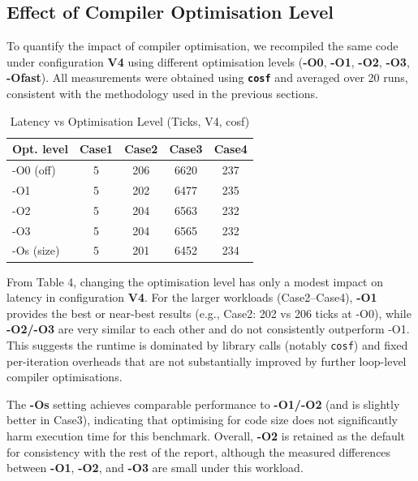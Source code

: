 \subsection{Effect of Compiler Optimisation Level}

To quantify the impact of compiler optimisation, we recompiled the same code under configuration \textbf{V4} using different optimisation levels (\textbf{-O0}, \textbf{-O1}, \textbf{-O2}, \textbf{-O3}, \textbf{-Ofast}). 
All measurements were obtained using \textbf{\texttt{cosf}} and averaged over 20 runs, consistent with the methodology used in the previous sections.

\begin{table}[H]
\centering
\caption{Latency vs Optimisation Level (Ticks, V4, cosf)}
\begin{tabular}{lcccc}
\toprule
Opt. level & Case1 & Case2 & Case3 & Case4 \\
\midrule
-O0 (off) & 5 & 206 & 6620 & 237 \\
-O1       & 5 & 202 & 6477 & 235 \\
-O2       & 5 & 204 & 6563 & 232 \\
-O3       & 5 & 204 & 6565 & 232 \\
-Os (size)& 5 & 201 & 6452 & 234 \\
\bottomrule
\end{tabular}
\end{table}

From Table 4, changing the optimisation level has only a modest impact on latency in configuration \textbf{V4}. 
For the larger workloads (Case2--Case4), \textbf{-O1} provides the best or near-best results (e.g., Case2: 202 vs 206 ticks at -O0), while \textbf{-O2/-O3} are very similar to each other and do not consistently outperform -O1. 
This suggests the runtime is dominated by library calls (notably \texttt{cosf}) and fixed per-iteration overheads that are not substantially improved by further loop-level compiler optimisations.

The \textbf{-Os} setting achieves comparable performance to \textbf{-O1/-O2} (and is slightly better in Case3), indicating that optimising for code size does not significantly harm execution time for this benchmark. 
Overall, \textbf{-O2} is retained as the default for consistency with the rest of the report, although the measured differences between \textbf{-O1}, \textbf{-O2}, and \textbf{-O3} are small under this workload.
